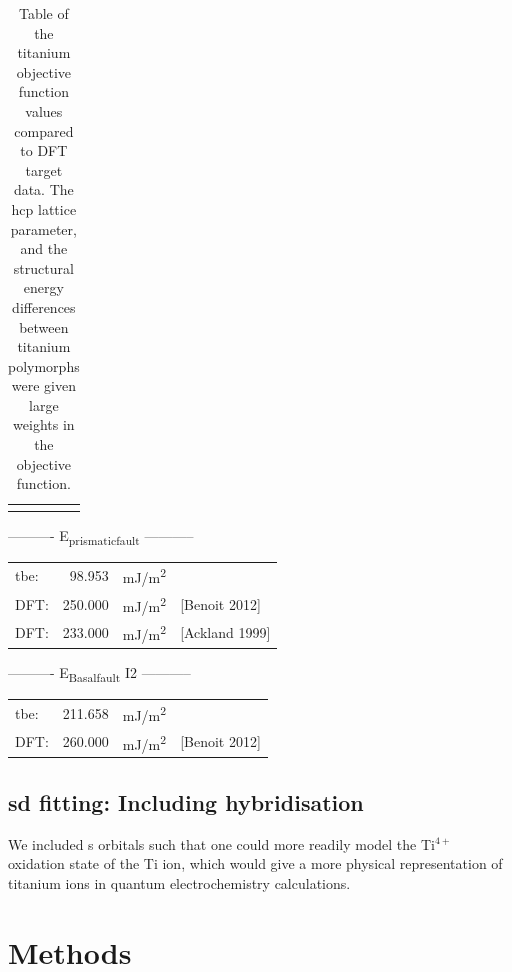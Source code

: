 \documentclass[a4paper,12pt,oneside,print,numbered,index,PageStyleIII]{PhDThesisPSnPDF}
\begin{document}
\begin{table}[H]
\begin{tabular}{lccc}
{{{  \end{tabular}
  \caption[Table of the titanium objective function values compared to DFT target data.] {Table of the titanium objective function values compared to DFT target data. The hcp lattice parameter, and the structural energy differences between titanium polymorphs were given large weights in the objective function. \label{table:titanium_objective_function}}
  \end{table}





----------     E\textsubscript{prismatic}\textsubscript{fault}     -----------

\begin{center}
\begin{tabular}{lrll}
tbe: & 98.953 & mJ/m\textsuperscript{2} & \\
DFT: & 250.000 & mJ/m\textsuperscript{2} & [Benoit  2012]\\
DFT: & 233.000 & mJ/m\textsuperscript{2} & [Ackland 1999]\\
\end{tabular}
\end{center}


----------     E\textsubscript{Basal}\textsubscript{fault} I2     -----------

\begin{center}
\begin{tabular}{lrll}
tbe: & 211.658 & mJ/m\textsuperscript{2} & \\
DFT: & 260.000 & mJ/m\textsuperscript{2} & [Benoit  2012]\\
\end{tabular}
\end{center}

\section{sd fitting: Including hybridisation}
\label{sec:orgb28a156}

We included s orbitals such that one could more readily model the
Ti\(^{4+}\) oxidation state of the Ti ion, which would give a more
physical representation of titanium ions in quantum electrochemistry
calculations.

\chapter{Methods}
\label{sec:orgb7e4734}
\end{document}
